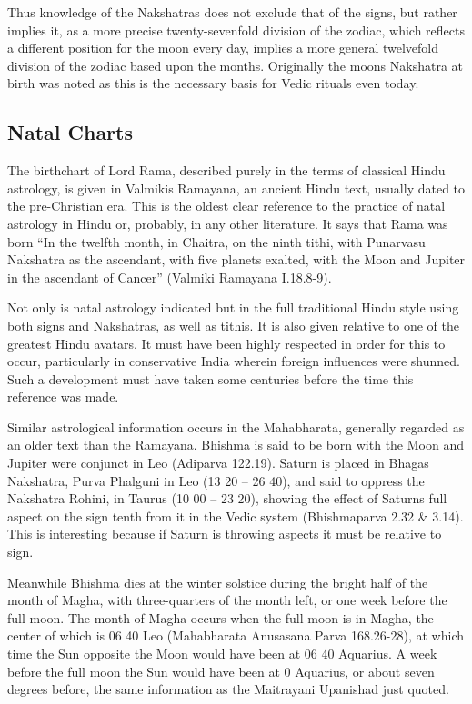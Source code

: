  

Thus knowledge of the Nakshatras does not exclude that of the signs, but rather implies it, as a more precise twenty-sevenfold division of the zodiac, which reflects a different position for the moon every day, implies a more general twelvefold division of the zodiac based upon the months. Originally the moons Nakshatra at birth was noted as this is the necessary basis for Vedic rituals even today.

 

\subsection{Natal Charts}

 

The birthchart of Lord Rama, described purely in the terms of classical Hindu astrology, is given in Valmikis Ramayana, an ancient Hindu text, usually dated to the pre-Christian era. This is the oldest clear reference to the practice of natal astrology in Hindu or, probably, in any other literature. It says that Rama was born “In the twelfth month, in Chaitra, on the ninth tithi, with Punarvasu Nakshatra as the ascendant, with five planets exalted, with the Moon and Jupiter in the ascendant of Cancer” (Valmiki Ramayana I.18.8-9).

 

Not only is natal astrology indicated but in the full traditional Hindu style using both signs and Nakshatras, as well as tithis. It is also given relative to one of the greatest Hindu avatars. It must have been highly respected in order for this to occur, particularly in conservative India wherein foreign influences were shunned. Such a development must have taken some centuries before the time this reference was made.

 

Similar astrological information occurs in the Mahabharata, generally regarded as an older text than the Ramayana. Bhishma is said to be born with the Moon and Jupiter were conjunct in Leo (Adiparva 122.19). Saturn is placed in Bhagas Nakshatra, Purva Phalguni in Leo (13 20 – 26 40), and said to oppress the Nakshatra Rohini, in Taurus (10 00 – 23 20), showing the effect of Saturns full aspect on the sign tenth from it in the Vedic system (Bhishmaparva 2.32 & 3.14). This is interesting because if Saturn is throwing aspects it must be relative to sign.

 

Meanwhile Bhishma dies at the winter solstice during the bright half of the month of Magha, with three-quarters of the month left, or one week before the full moon. The month of Magha occurs when the full moon is in Magha, the center of which is 06 40 Leo (Mahabharata Anusasana Parva 168.26-28), at which time the Sun opposite the Moon would have been at 06 40 Aquarius. A week before the full moon the Sun would have been at 0 Aquarius, or about seven degrees before, the same information as the Maitrayani Upanishad just quoted.

